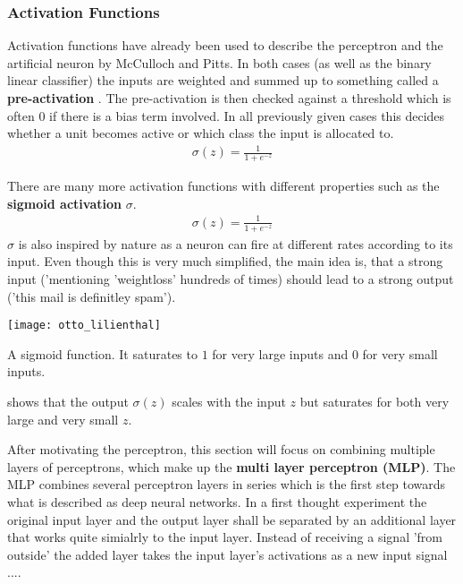 \subsubsection{Activation Functions}
Activation functions have already been used to describe the perceptron and the artificial neuron by McCulloch and Pitts.
In both cases (as well as the binary linear classifier) the inputs are weighted and summed up to something called a \textbf{pre-activation} \cite[p.~6]{GrosseNotes}.
The pre-activation is then checked against a threshold which is often $0$ if there is a bias term involved.
In all previously given cases this decides whether a unit becomes active or which class the input is allocated to.
\begin{align}
    \sigma(z) = \frac{1}{1 + e^{-z}}
\end{align}

There are many more activation functions with different properties such as the \textbf{sigmoid activation} $\sigma$.
\begin{align}
    \sigma(z) = \frac{1}{1 + e^{-z}}
\end{align}
$\sigma$ is also inspired by nature as a neuron can fire at different rates according to its input.
Even though this is very much simplified, the main idea is, that a strong input ('mentioning 'weightloss' hundreds of times) should lead to a strong output ('this mail is definitley spam').
\begin{marginfigure}
    \texttt{[image: otto\_lilienthal]}
    \caption[]{A sigmoid function. It saturates to $1$ for very large inputs and $0$ for very small inputs.}
\end{marginfigure}

 shows that the output $\sigma(z)$ scales with the input $z$ but saturates for both very large and very small $z$.




After motivating the perceptron, this section will focus on combining multiple layers of perceptrons, which make up the \textbf{multi layer perceptron (MLP)}.
The MLP combines several perceptron layers in series which is the first step towards what is described as deep neural networks.
In a first thought experiment the original input layer and the output layer shall be separated by an additional layer that works quite simialrly to the input layer.
Instead of receiving a signal 'from outside' the added layer takes the input layer's activations as a new input signal ....

